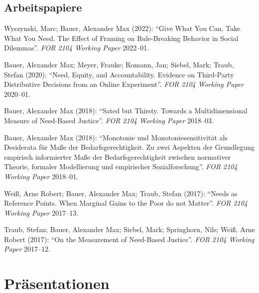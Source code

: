 \documentclass[a4paper,10pt]{article}
\newenvironment{literature}{%
   \parskip6pt\parindent0pt\raggedright
   \def\lititem{\hangindent=1cm\hangafter1}}{%
   \par\ignorespaces}
\begin{document}
\subsection*{Arbeitspapiere}
\begin{literature}
\lititem Wyszynski, Marc; Bauer, Alexander Max (2022): \enquote{Give What You Can, Take What You Need. The Effect of Framing on Rule-Breaking Behavior in Social Dilemmas}. \textit{FOR 2104 Working Paper} 2022--01.

\lititem Bauer, Alexander Max; Meyer, Frauke; Romann, Jan; Siebel, Mark; Traub, Stefan (2020): \enquote{Need, Equity, and Accountability. Evidence on Third-Party Distributive Decisions from an Online Experiment}. \textit{FOR 2104 Working Paper} 2020--01.

\lititem Bauer, Alexander Max (2018): \enquote{Sated but Thirsty. Towards a Multidimensional Measure of Need-Based Justice}. \textit{FOR 2104 Working Paper} 2018--03.

\lititem Bauer, Alexander Max (2018): \enquote{Monotonie und Monotoniesensitivität als Desiderata für Maße der Bedarfsgerechtigkeit. Zu zwei Aspekten der Grundlegung empirisch informierter Maße der Bedarfsgerechtigkeit zwischen normativer Theorie, formaler Modellierung und empirischer Sozialforschung}. \textit{FOR 2104 Working Paper} 2018--01.

\lititem Weiß, Arne Robert; Bauer, Alexander Max; Traub, Stefan (2017): \enquote{Needs as Reference Points. When Marginal Gains to the Poor do not Matter}. \textit{FOR 2104 Working Paper} 2017--13.

\lititem Traub, Stefan; Bauer, Alexander Max; Siebel, Mark; Springhorn, Nils; Weiß, Arne Robert (2017): \enquote{On the Measurement of Need-Based Justice}. \textit{FOR 2104 Working Paper} 2017--12.
\end{literature}


\section{Präsentationen}
\end{document}

